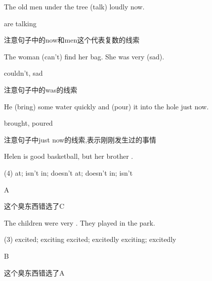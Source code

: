 


\begin{question}[tags={xiaoxuect}]
The old men under the tree \blank[width=1.5cm]{}(talk) loudly now.
\end{question}
\begin{solution}
are talking

注意句子中的now和men这个代表复数的线索
\end{solution}

\begin{question}[tags={xiaoxuect}]
The woman \blank[width=1cm]{}(can't) find her bag. She was very \blank[width=1cm]{}(sad).
\end{question}
\begin{solution}
couldn't, sad

注意句子中的was的线索
\end{solution}

\begin{question}[tags={xiaoxuect}]
He \blank[width=1cm]{}(bring) some water quickly and \blank[width=1cm]{}(pour) it into the hole just now.
\end{question}
\begin{solution}
brought, poured

注意句子中just now的线索,表示刚刚发生过的事情
\end{solution}


\begin{question}[tags={xiaoxuect}]
Helen is good \blank[width=1cm]{} basketball, but her brother \blank[width=1cm]{}.

  \begin{tasks}(4)
    \task at; isn't
    \task in; doesn't
    \task at; doesn't
    \task in; isn't
  \end{tasks}
\end{question}
\begin{solution}
A

这个臭东西错选了C
\end{solution}

\begin{question}[tags={xiaoxuect}]
The children were very \blank[width=1cm]{}. They played \blank[width=1cm]{} in the park.

  \begin{tasks}(3)
    \task excited; exciting
    \task excited; excitedly
    \task exciting; excitedly
  \end{tasks}
\end{question}
\begin{solution}
B

这个臭东西错选了A
\end{solution}

